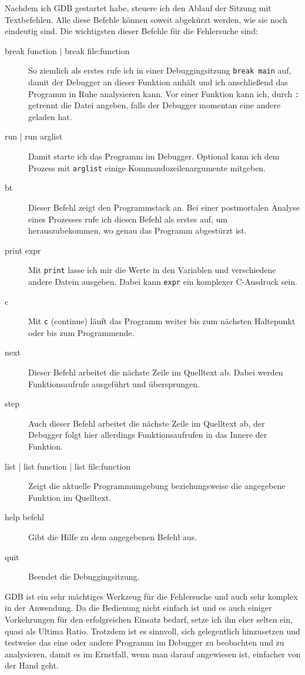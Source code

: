 \begin{normaltext}
  Nachdem ich GDB gestartet habe, steuere ich den Ablauf der Sitzung mit
  Textbefehlen. Alle diese Befehle können soweit abgekürzt werden, wie sie
  noch eindeutig sind.
  Die wichtigsten dieser Befehle für die Fehlersuche sind:
  \begin{description}
    \item[break function | break file:function] So ziemlich als erstes rufe
      ich in einer Debuggingsitzung \verb?break main? auf, damit der Debugger
      an dieser Funktion anhält und ich anschließend das Programm in Ruhe
      analysieren kann. Vor einer Funktion kann ich, durch \verb?:? getrennt
      die Datei angeben, falls der Debugger momentan eine andere geladen hat.
    \item[run | run arglist] Damit starte ich das Programm im Debugger.
      Optional kann ich dem Prozess mit \verb?arglist? einige
      Kommandozeilenargumente mitgeben.
    \item[bt] Dieser Befehl zeigt den Programmstack an. Bei einer postmortalen
      Analyse eines Prozesses rufe ich diesen Befehl als erstes auf, um
      herauszubekommen, wo genau das Programm abgestürzt ist.
    \item[print expr] Mit \verb?print? lasse ich mir die Werte in den
      Variablen und verschiedene andere Datein ausgeben. Dabei kann
      \verb?expr? ein komplexer C-Ausdruck sein.
    \item[c] Mit \verb?c? (continue) läuft das Programm weiter bis zum
      nächsten Haltepunkt oder bis zum Programmende.
    \item[next] Dieser Befehl arbeitet die nächste Zeile im Quelltext ab.
      Dabei werden Funktionsaufrufe ausgeführt und übersprungen.
    \item[step] Auch dieser Befehl arbeitet die nächste Zeile im Quelltext ab,
      der Debugger folgt hier allerdings Funktionsaufrufen in das Innere der
      Funktion.
    \item[list | list function | list file:function] Zeigt die aktuelle
      Programmumgebung beziehungsweise die angegebene Funktion im Quelltext.
    \item[help befehl] Gibt die Hilfe zu dem angegebenen Befehl aus.
    \item[quit] Beendet die Debuggingsitzung.
  \end{description}

  GDB ist ein sehr mächtiges Werkzeug für die Fehlersuche und auch sehr
  komplex in der Anwendung. Da die Bedienung nicht einfach ist und es auch
  einiger Vorkehrungen für den erfolgreichen Einsatz bedarf, setze ich ihn
  eher selten ein, quasi als Ultima Ratio. Trotzdem ist es sinnvoll, sich
  gelegentlich hinzusetzen und testweise das eine oder andere Programm im
  Debugger zu beobachten und zu analysieren, damit es im Ernstfall, wenn man
  darauf angewiesen ist, einfacher von der Hand geht.
\end{normaltext}

